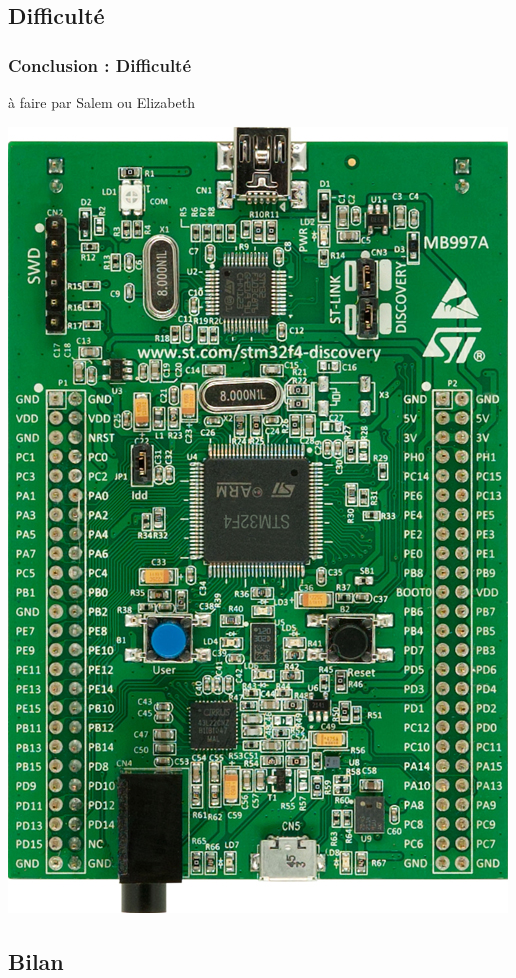 \documentclass{beamer}
\begin{document}
\subsection{Difficulté}
\begin{frame}
\frametitle{Conclusion : Difficulté}
à faire par Salem ou Elizabeth
\begin{center}
 \includegraphics[scale=0.1]{../images/stm32f4_discovery.jpg}
\end{center}
\end{frame}

\subsection{Bilan}
\end{document}
